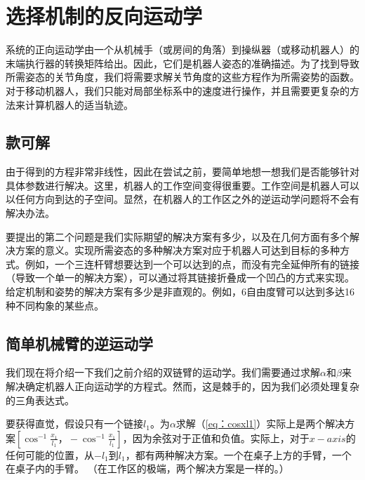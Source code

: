 
\section{选择机制的反向运动学}
系统的正向运动学由一个从机械手（或房间的角落）到操纵器（或移动机器人）的末端执行器的转换矩阵给出。因此，它们是机器人姿态的准确描述。为了找到导致所需姿态的关节角度，我们将需要求解关节角度的这些方程作为所需姿势的函数。对于移动机器人，我们只能对局部坐标系中的速度进行操作，并且需要更复杂的方法来计算机器人的适当轨迹。

\subsection{款可解}
由于得到的方程非常非线性，因此在尝试之前，要简单地想一想我们是否能够针对具体参数进行解决。这里，机器人的工作空间变得很重要。工作空间是机器人可以以任何方向到达的子空间。显然，在机器人的工作区之外的逆运动学问题将不会有解决办法。

要提出的第二个问题是我们实际期望的解决方案有多少，以及在几何方面有多个解决方案的意义。实现所需姿态的多种解决方案对应于机器人可达到目标的多种方式。例如，一个三连杆臂想要达到一个可以达到的点，而没有完全延伸所有的链接（导致一个单一的解决方案），可以通过将其链接折叠成一个凹凸的方式来实现。给定机制和姿势的解决方案有多少是非直观的。例如，6自由度臂可以达到多达16种不同构象的某些点。

\subsection{简单机械臂的逆运动学}
我们现在将介绍一下我们之前介绍的双链臂的运动学。我们需要通过求解$ \alpha $和$ \beta $来解决确定机器人正向运动学的方程式。然而，这是棘手的，因为我们必须处理复杂的三角表达式。

要获得直觉，假设只有一个链接$ l_1 $。为$ \alpha $求解（\ref {eq：cosxl1}）实际上是两个解决方案$ \left [\cos ^ { - 1} \frac {x_1} {l_1}， - \cos ^ { - 1} \frac { x_1} {l_1} \right] $，因为余弦对于正值和负值。实际上，对于$ x-axis $的任何可能的位置，从$ -l_1 $到$ l_1 $，都有两种解决方案。一个在桌子上方的手臂，一个在桌子内的手臂。 （在工作区的极端，两个解决方案是一样的。）

